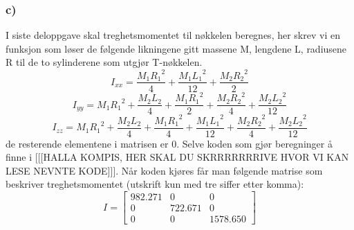 \subsubsection{c)}
I siste deloppgave skal treghetsmomentet til nøkkelen beregnes, her skrev vi en funksjon som løser de følgende likningene gitt massene M, lengdene L, radiusene R til de to sylinderene som utgjør T-nøkkelen. \begin{equation}
    I_{xx}= \frac{M_1{R_1}^2}{4} + \frac{M_1{L_1}^2}{12} + \frac{M_2{R_2}^2}{2}
\end{equation}
\begin{equation}
    I_{yy}= M_1{R_1}^2 + \frac{M_2{L_2}}{4} + \frac{M_1{R_1}^2}{2} + \frac{M_2{R_2}^2}{4} + \frac{M_2{L_2}^2}{12}
\end{equation}
\begin{equation}
    I_{zz}= M_1{R_1}^2 + \frac{M_2{L_2}}{4} + \frac{M_1{R_1}^2}{4} + \frac{M_1{L_1}^2}{12} + \frac{M_2{R_2}^2}{4} + \frac{M_2{L_2}^2}{12}
\end{equation} 
\newline
de resterende elementene i matrisen er 0. Selve koden som gjør beregninger å finne i [[[HALLA KOMPIS, HER SKAL DU SKRRRRRRRIVE HVOR VI KAN LESE NEVNTE KODE]]]. Når koden kjøres får man følgende matrise som beskriver treghetsmomentet (utskrift kun med tre siffer etter komma): \newline
\begin{equation}
I = 
\begin{bmatrix}
982.271 & 0 & 0 \\
0 & 722.671 & 0 \\
0 & 0 & 1578.650
\end{bmatrix}
\end{equation}